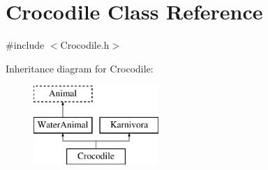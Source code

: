 \hypertarget{classCrocodile}{\section{Crocodile Class Reference}
\label{classCrocodile}
}


{\ttfamily \#include $<$Crocodile.\-h$>$}

Inheritance diagram for Crocodile\-:\begin{figure}[H]
\begin{center}
\leavevmode
\includegraphics[height=3.000000cm]{classCrocodile}
\end{center}
\end{figure}
